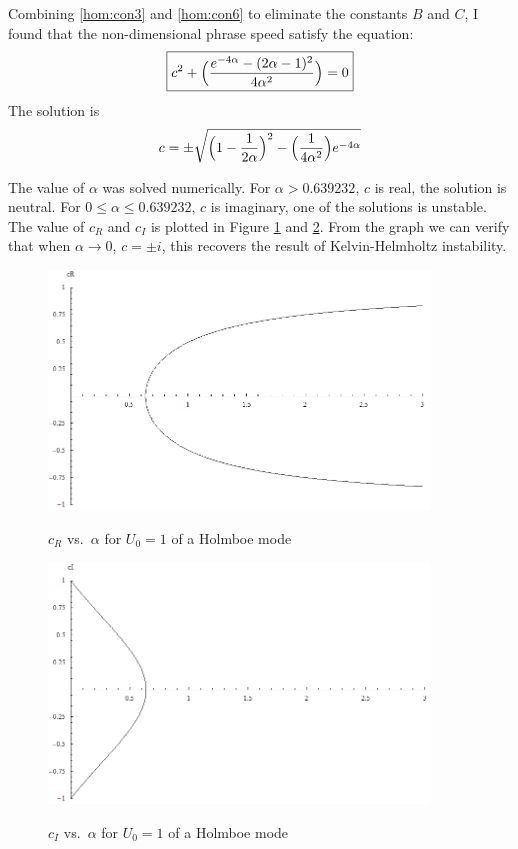 Combining \eqref{hom:con3} and \eqref{hom:con6} to eliminate the
constants $B$ and $C$, I found that the non-dimensional phrase speed
satisfy the equation:
\begin{equation}\label{hom:con}
    \boxed{c^2+\Bigl(\frac{e^{-4\alpha}-(2\alpha-1)^2}{4\alpha^2}\Bigr)=0}
\end{equation}
The solution is
\begin{equation}\label{hom:con7}
    c=\pm\sqrt{\Bigl(1-\frac{1}{2\alpha}\Bigr)^2-\Bigl(\frac{1}{4\alpha^2}\Bigr)e^{-4\alpha}}
\end{equation}

The value of $\alpha$ was solved numerically. For $\alpha>0.639232$,
$c$ is real, the solution is neutral. For $0\leq\alpha\leq0.639232$,
$c$ is imaginary, one of the solutions is unstable. The value of
$c_R$ and $c_I$ is plotted in Figure \ref{ho1} and \ref{ho2}. From
the graph we can verify that when $\alpha \rightarrow 0$, $c=\pm i$,
this recovers the result of Kelvin-Helmholtz instability.
\begin{figure}[htpb]
  \centering
  \includegraphics[width=0.9\textwidth]{ho1.png}\\
  \caption{$c_R$ vs.~$\alpha$ for $U_0=1$ of a Holmboe mode}\label{ho1}
\end{figure}
\begin{figure}[htpb]
  \centering
  \includegraphics[width=0.9\textwidth]{ho2.png}\\
  \caption{$c_I$ vs.~$\alpha$ for $U_0=1$ of a Holmboe mode}\label{ho2}
\end{figure}
